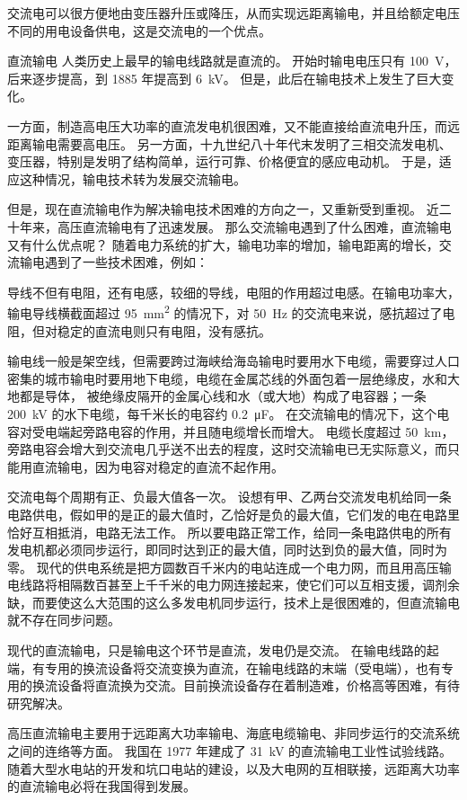 交流电可以很方便地由变压器升压或降压，从而实现远距离输电，并且给额定电压不同的用电设备供电，这是交流电的一个优点。

\begin{Reading}{直流输电}
人类历史上最早的输电线路就是直流的。
开始时输电电压只有 \qty{100}{V}，后来逐步提高，到 1885 年提高到 \qty{6}{kV}。
但是，此后在输电技术上发生了巨大变化。

一方面，制造高电压大功率的直流发电机很困难，又不能直接给直流电升压，而远距离输电需要高电压。
另一方面，十九世纪八十年代末发明了三相交流发电机、变压器，特别是发明了结构简单，运行可靠、价格便宜的感应电动机。
于是，适应这种情况，输电技术转为发展交流输电。

但是，现在直流输电作为解决输电技术困难的方向之一，又重新受到重视。
近二十年来，高压直流输电有了迅速发展。
那么交流输电遇到了什么困难，直流输电又有什么优点呢？
随着电力系统的扩大，输电功率的增加，输电距离的增长，交流输电遇到了一些技术困难，例如：

导线不但有电阻，还有电感，较细的导线，电阻的作用超过电感。在输电功率大，输电导线横截面超过 \qty{95}{mm^2} 的情况下，对 \qty{50}{Hz} 的交流电来说，感抗超过了电阻，但对稳定的直流电则只有电阻，没有感抗。

输电线一般是架空线，但需要跨过海峡给海岛输电时要用水下电缆，需要穿过人口密集的城市输电时要用地下电缆，电缆在金属芯线的外面包着一层绝缘皮，水和大地都是导体，
被绝缘皮隔开的金属心线和水（或大地）构成了电容器；一条 \qty{200}{kV} 的水下电缆，每千米长的电容约 \qty{0.2}{\micro F}。
在交流输电的情况下，这个电容对受电端起旁路电容的作用，并且随电缆增长而增大。
电缆长度超过 \qty{50}{km}，旁路电容会增大到交流电几乎送不出去的程度，这时交流输电已无实际意义，而只能用直流输电，因为电容对稳定的直流不起作用。

交流电每个周期有正、负最大值各一次。
设想有甲、乙两台交流发电机给同一条电路供电，假如甲的是正的最大值时，乙恰好是负的最大值，它们发的电在电路里恰好互相抵消，电路无法工作。
所以要电路正常工作，给同一条电路供电的所有发电机都必须同步运行，即同时达到正的最大值，同时达到负的最大值，同时为零。
现代的供电系统是把方圆数百千米内的电站连成一个电力网，而且用高压输电线路将相隔数百甚至上千千米的电力网连接起来，使它们可以互相支援，调剂余缺，而要使这么大范围的这么多发电机同步运行，技术上是很困难的，但直流输电就不存在同步问题。

现代的直流输电，只是输电这个环节是直流，发电仍是交流。
在输电线路的起端，有专用的换流设备将交流变换为直流，在输电线路的末端（受电端），也有专用的换流设备将直流换为交流。目前换流设备存在着制造难，价格高等困难，有待研究解决。

高压直流输电主要用于远距离大功率输电、海底电缆输电、非同步运行的交流系统之间的连络等方面。
我国在 1977 年建成了 \qty{31}{kV} 的直流输电工业性试验线路。
随着大型水电站的开发和坑口电站的建设，以及大电网的互相联接，远距离大功率的直流输电必将在我国得到发展。
\end{Reading}

